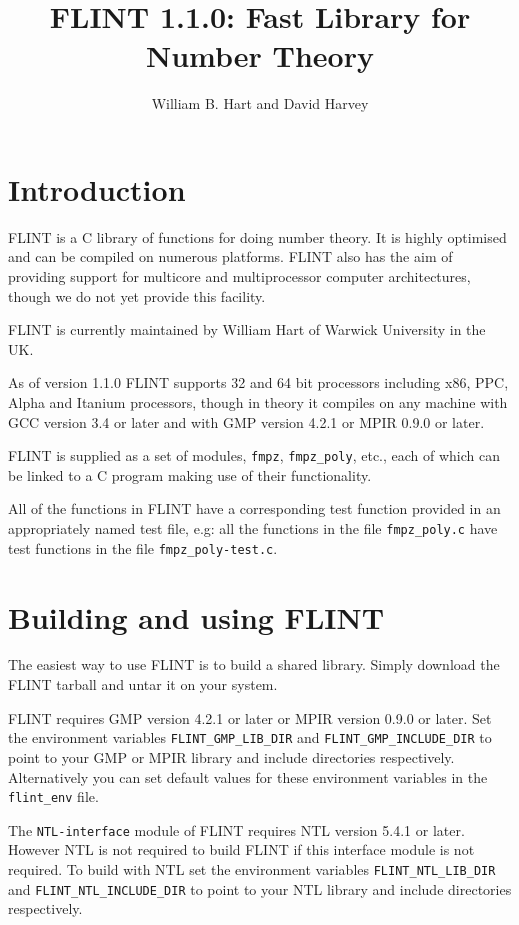 \documentclass[a4paper,10pt]{article}
\title{FLINT 1.1.0: Fast Library for Number Theory}
\author{William B. Hart and David Harvey}
\newcommand{\code}{\lstinline}
\begin{document}
\maketitle
\tableofcontents
\lstset{language=c}
\lstset{basicstyle=\ttfamily}
\lstset{keywordstyle=}
\lstset{escapeinside=\%\%}

\section{Introduction}

FLINT is a C library of functions for doing number theory. It is highly optimised and can be compiled on numerous platforms. FLINT also has the aim of providing support for multicore and multiprocessor computer architectures, though we do not yet provide this facility.

FLINT is currently maintained by William Hart of Warwick University in the UK.

As of version 1.1.0 FLINT supports 32 and 64 bit processors including x86, PPC, Alpha and Itanium processors, though in theory it compiles on any machine with GCC version 3.4 or later and with GMP version 4.2.1 or MPIR 0.9.0 or later.

FLINT is supplied as a set of modules, \code{fmpz}, \code{fmpz_poly}, etc., each of which can be linked to a C program making use of their functionality. 

All of the functions in FLINT have a corresponding test function provided in an appropriately named test file, e.g: all the functions in the file \code{fmpz_poly.c} have test functions in the file \code{fmpz_poly-test.c}.

\section{Building and using FLINT}

The easiest way to use FLINT is to build a shared library. Simply download the FLINT tarball and untar it on your system.

FLINT requires GMP version 4.2.1 or later or MPIR version 0.9.0 or later. Set the environment variables \code{FLINT_GMP_LIB_DIR} and \code{FLINT_GMP_INCLUDE_DIR} to point to your GMP or MPIR library and include directories respectively. Alternatively you can set default values for these environment variables in the \code{flint_env} file.

The \code{NTL-interface} module of FLINT requires NTL version 5.4.1 or later. However NTL is not required to build FLINT if this interface module is not required. To build with NTL set the environment variables \code{FLINT_NTL_LIB_DIR} and \code{FLINT_NTL_INCLUDE_DIR} to point to your NTL library and include directories respectively.
\end{document}
